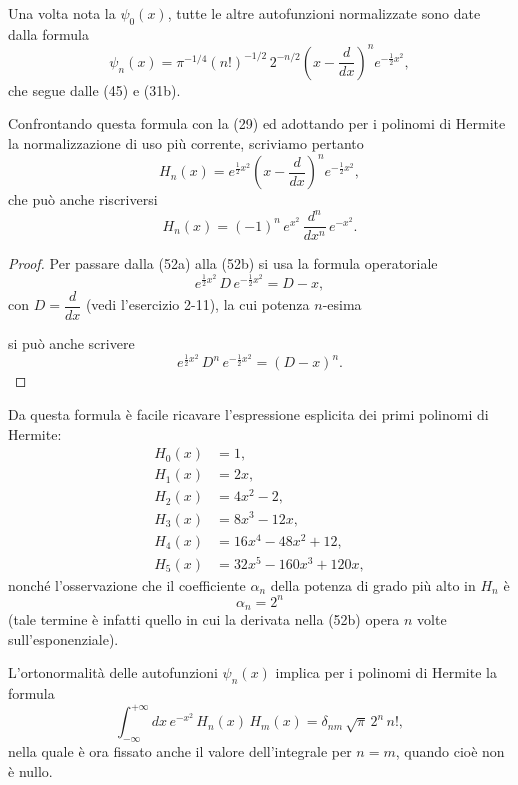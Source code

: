 \documentclass[11pt, a4paper]{book}
\numberwithin{equation}{section}
\begin{document}
Una volta nota la $\psi_0(x)$, tutte le altre autofunzioni normalizzate
sono date dalla formula
\begin{equation}
\psi_n(x) = \pi^{-1/4}(n!)^{-1/2}\,2^{-n/2}
  \left(x-\frac{d}{dx}\right)^n e^{-\frac{1}{2}x^2},
\end{equation}
che segue dalle (45) e (31b).

Confrontando questa formula con la (29) ed adottando per i polinomi di
Hermite la normalizzazione di uso più corrente, scriviamo pertanto
\begin{equation}
H_n(x) = e^{\frac{1}{2}x^2}\left(x-\frac{d}{dx}\right)^n e^{-\frac{1}{2}x^2}, \tag{52a}
\end{equation}
che può anche riscriversi
\begin{equation}
H_n(x) = (-1)^n\,e^{x^2}\,\frac{d^n}{dx^n}\,e^{-x^2}. \tag{52b}
\end{equation}

\begin{proof}
Per passare dalla (52a) alla (52b) si usa la formula operatoriale
\[
e^{\frac{1}{2}x^2}\,D\,e^{-\frac{1}{2}x^2} = D - x,
\]
con $D = \dfrac{d}{dx}$ (vedi l'esercizio 2-11), la cui potenza $n$-esima

si può anche scrivere
\[
e^{\frac{1}{2}x^2}\,D^n\,e^{-\frac{1}{2}x^2} = (D-x)^n.
\]
\end{proof}

Da questa formula è facile ricavare l'espressione esplicita dei primi
polinomi di Hermite:
\begin{align}
H_0(x) &= 1, \tag{53a} \\
H_1(x) &= 2x, \tag{53b} \\
H_2(x) &= 4x^2-2, \tag{53c} \\
H_3(x) &= 8x^3-12x, \tag{53d} \\
H_4(x) &= 16x^4-48x^2+12, \tag{53e} \\
H_5(x) &= 32x^5-160x^3+120x, \tag{53f}
\end{align}
nonché l'osservazione che il coefficiente $\alpha_n$ della potenza di grado
più alto in $H_n$ è
\begin{equation}
\alpha_n = 2^n
\end{equation}
(tale termine è infatti quello in cui la derivata nella (52b) opera $n$
volte sull'esponenziale).

L'ortonormalità delle autofunzioni $\psi_n(x)$ implica per i polinomi
di Hermite la formula
\begin{equation}
\int_{-\infty}^{+\infty} dx\,e^{-x^2}\,H_n(x)\,H_m(x)
= \delta_{nm}\,\sqrt{\pi}\,2^n\,n!,
\end{equation}
nella quale è ora fissato anche il valore dell'integrale per $n = m$,
quando cioè non è nullo.
\end{document}
